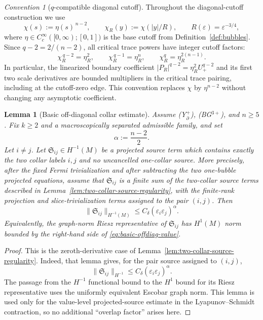 \documentclass[11pt,reqno,a4paper]{amsart}
\numberwithin{equation}{section}
\theoremstyle{plain}
\newtheorem{lemma}[theorem]{Lemma}
\theoremstyle{remark}
\newtheorem{convention}[theorem]{Convention}
\theoremstyle{plain}
\begin{document}
\begin{convention}[$q$-compatible diagonal cutoff]\label{conv:q-compatible-cutoff}
Throughout the diagonal-cutoff construction we use
\[
\chi(s):=\eta(s)^{\,n-2},
\qquad
\chi_R(y):=\chi(|y|/R),
\qquad
R(\varepsilon)=\varepsilon^{-3/4},
\]
where $\eta\in C^\infty_c([0,\infty);[0,1])$ is the base cutoff from
Definition~\ref{def:bubbles}.
Since $q-2=2/(n-2)$, all critical trace powers have integer cutoff factors:
\[
\chi_R^{\,q-2}=\eta_R^2,
\qquad
\chi_R^{\,q-1}=\eta_R^n,
\qquad
\chi_R^q=\eta_R^{2(n-1)}.
\]
In particular, the linearized boundary coefficient $|P_R|^{q-2}=\eta_R^2U_+^{q-2}$
and its first two scale derivatives are bounded multipliers in the critical
trace pairing, including at the cutoff-zero edge.  This convention replaces
$\chi$ by $\eta^{n-2}$ without changing any asymptotic coefficient.
\end{convention}


\begin{lemma}[Basic off-diagonal collar estimate]
\label{lem:basic-offdiag-collar-estimate}
Assume \textup{(Y$^+_{\partial}$)}, \textup{(BG$^{3+}$)}, and $n\ge5$.
Fix $k\ge2$ and a macroscopically separated admissible family, and set
\[
\alpha:=\frac{n-2}{2}.
\]
Let $i\ne j$.  Let $\mathfrak S_{ij}\in H^{-1}(M)$ be a projected source term
which contains exactly the two collar labels $i,j$ and no uncancelled one-collar
source.  More precisely, after the fixed Fermi trivialization and after
subtracting the two one-bubble projected equations, assume that
$\mathfrak S_{ij}$ is a finite sum of the two-collar source terms described in
Lemma~\ref{lem:two-collar-source-regularity}, with the finite-rank projection and
slice-trivialization terms assigned to the pair $(i,j)$.  Then
\begin{equation}\label{eq:basic-offdiag-value}
\|\mathfrak S_{ij}\|_{H^{-1}(M)}
\le C_{\delta}(\varepsilon_i\varepsilon_j)^\alpha .
\end{equation}
Equivalently, the graph-norm Riesz representative of $\mathfrak S_{ij}$ has
$H^1(M)$ norm bounded by the right-hand side of
\eqref{eq:basic-offdiag-value}.
\end{lemma}

\begin{proof}
This is the zeroth-derivative case of
Lemma~\ref{lem:two-collar-source-regularity}.  Indeed, that lemma gives, for the
pair source assigned to $(i,j)$,
\[
\|\mathfrak S_{ij}\|_{H^{-1}}
\le C_\delta(\varepsilon_i\varepsilon_j)^\alpha .
\]
The passage from the $H^{-1}$ functional bound to the $H^1$ bound for its Riesz
representative uses the uniformly equivalent Escobar graph norm.  This lemma is used only for the value-level projected-source estimate in the Lyapunov--Schmidt contraction, so no additional ``overlap factor'' arises here.
\end{proof}
\end{document}
